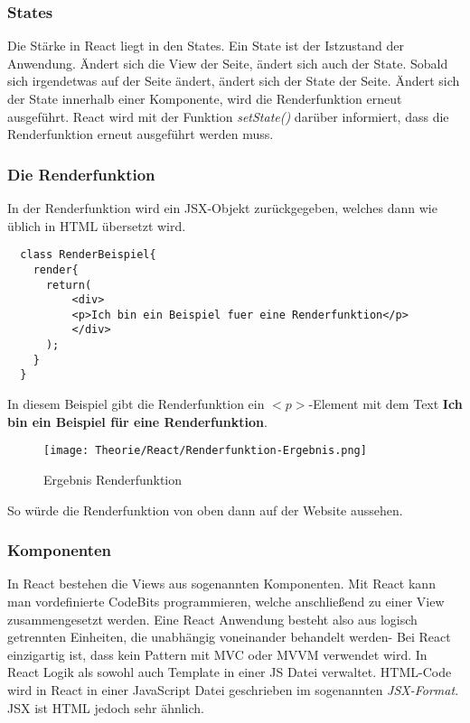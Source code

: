 \subsubsection{States}
Die Stärke in React liegt in den States. Ein State ist der Istzustand der Anwendung. Ändert sich 
die View der Seite, ändert sich auch der State. Sobald sich irgendetwas auf der Seite ändert, 
ändert sich der State der Seite. Ändert sich der State innerhalb einer Komponente, wird die 
Renderfunktion erneut ausgeführt. React wird mit der Funktion \textit{setState()} darüber informiert,
dass die Renderfunktion erneut ausgeführt werden muss.\pagebreak

\subsubsection{Die Renderfunktion}
In der Renderfunktion wird ein JSX-Objekt zurückgegeben, welches dann wie üblich in HTML
übersetzt wird. 

\begin{lstlisting}
  class RenderBeispiel{
    render{
      return(
          <div>
          <p>Ich bin ein Beispiel fuer eine Renderfunktion</p>
          </div>
      );
    }
  }
\end{lstlisting}

In diesem Beispiel gibt die Renderfunktion ein $<p>$-Element mit dem Text \textbf{Ich bin ein 
Beispiel für eine Renderfunktion}. 

\begin{figure}[H]
  \begin{center}
    \texttt{[image: Theorie/React/Renderfunktion-Ergebnis.png]}
    \caption{Ergebnis Renderfunktion}
  \end{center}
\end{figure}

So würde die Renderfunktion von oben dann auf der Website aussehen.


\subsubsection{Komponenten}
In React bestehen die Views aus sogenannten Komponenten. Mit React kann man vordefinierte CodeBits 
programmieren, welche anschließend zu einer View zusammengesetzt werden. Eine React Anwendung 
besteht also aus logisch getrennten Einheiten, die unabhängig voneinander behandelt werden-
Bei React einzigartig ist, dass kein Pattern mit MVC oder MVVM verwendet wird. In React Logik als 
sowohl auch Template in einer JS Datei verwaltet.
HTML-Code wird in React in einer JavaScript Datei geschrieben im sogenannten \textit{JSX-Format}. 
JSX ist HTML jedoch sehr ähnlich.\cite{Komp}



